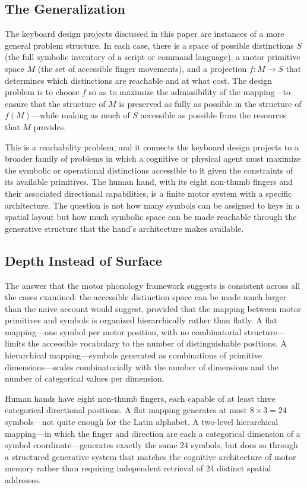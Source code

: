\documentclass[12pt,a4paper]{article}
\theoremstyle{plain}
\theoremstyle{definition}
\theoremstyle{remark}
\begin{document}
\subsection{The Generalization}

The keyboard design projects discussed in this paper are instances of a more
general problem structure. In each case, there is a space of possible
distinctions $S$ (the full symbolic inventory of a script or command language),
a motor primitive space $M$ (the set of accessible finger movements), and a
projection $f : M \to S$ that determines which distinctions are reachable and
at what cost. The design problem is to choose $f$ so as to maximize the
admissibility of the mapping---to ensure that the structure of $M$ is preserved
as fully as possible in the structure of $f(M)$---while making as much of $S$
accessible as possible from the resources that $M$ provides.

This is a reachability problem, and it connects the keyboard design projects
to a broader family of problems in which a cognitive or physical agent must
maximize the symbolic or operational distinctions accessible to it given
the constraints of its available primitives. The human hand, with its eight
non-thumb fingers and their associated directional capabilities, is a
finite motor system with a specific architecture. The question is not how
many symbols can be assigned to keys in a spatial layout but how much
symbolic space can be made reachable through the generative structure that
the hand's architecture makes available.

\subsection{Depth Instead of Surface}

The answer that the motor phonology framework suggests is consistent across
all the cases examined: the accessible distinction space can be made much
larger than the naive account would suggest, provided that the mapping between
motor primitives and symbols is organized hierarchically rather than flatly.
A flat mapping---one symbol per motor position, with no combinatorial
structure---limits the accessible vocabulary to the number of
distinguishable positions. A hierarchical mapping---symbols generated as
combinations of primitive dimensions---scales combinatorially with the number
of dimensions and the number of categorical values per dimension.

Human hands have eight non-thumb fingers, each capable of at least three
categorical directional positions. A flat mapping generates at most
$8 \times 3 = 24$ symbols---not quite enough for the Latin alphabet.
A two-level hierarchical mapping---in which the finger and direction are
each a categorical dimension of a symbol coordinate---generates exactly
the same 24 symbols, but does so through a structured generative system
that matches the cognitive architecture of motor memory rather than
requiring independent retrieval of 24 distinct spatial addresses.
\end{document}
